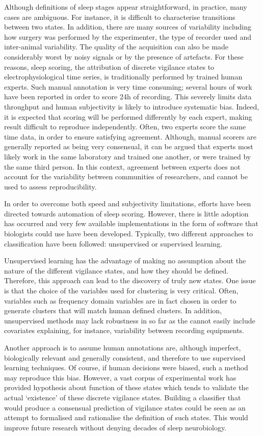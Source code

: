 Although definitions of sleep stages appear straightforward, in practice, many cases are ambiguous.
For instance, it is difficult to characterise transitions between two states.
In addition, there are many sources of variability including how surgery was performed by the experimenter, the type of recorder used and inter-animal variability.
The quality of the acquisition can also be made considerably worst by noisy signals or by the presence of artefacts.
For these reasons, sleep scoring, the attribution of discrete vigilance states to electrophysiological time series,
is traditionally performed by trained human experts.
Such manual annotation is very time consuming; several hours of work have been reported in order to score 24h of recording.
This severely limits data throughput and human subjectivity is likely to introduce systematic bias.
Indeed, it is expected that scoring will be performed differently by each expert, making result difficult to reproduce independently.
Often, two experts score the same time data, in order to ensure satisfying agreement.
Although, manual scorers are generally reported as being very consensual\citationneeded{},
it can be argued that experts most likely work in the same laboratory and trained one another, or were trained by the same third person.
In this context, agreement between experts does not account for the variability between communities of researchers, and cannot be used to assess reproducibility.

In order to overcome both speed and subjectivity limitations, efforts have been directed towards automation of sleep scoring.
However, there is little adoption has occurred and very few available implementations in the form of software that biologists could use have been developed.
Typically, two different approaches to classification have been followed: unsupervised or supervised learning.

Unsupervised learning has the advantage of making no assumption about the nature of the different vigilance states, and how they should be defined.
Therefore, this approach can lead to the discovery of truly new states.
One issue is that the choice of the variables used for clustering is very critical.
Often, variables such as frequency domain variables are in fact chosen in order to generate clusters that will match human defined clusters.
In addition, unsupervised methods may lack robustness in so far as the cannot easily include covariates explaining, for instance, variability between recording equipments.

Another approach is to assume human annotations are, although imperfect, biologically relevant and generally consistent,
 and therefore to use supervised learning techniques.
Of course, if human decisions were biased, such a method may reproduce this bias.
However, a vast corpus of experimental work has provided hypothesis about function of these states which tends to validate the actual `existence' of these discrete vigilance states.
Building a classifier that would produce a consensual prediction of vigilance states could be seen as an attempt to formalised and rationalise the definition of such states.
This would improve future research without denying decades of sleep neurobiology.

